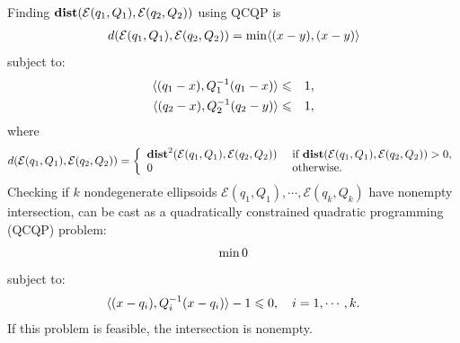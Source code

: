 \documentclass[letterpaper,10pt,english]{sphinxmanual}
\begin{document}
Finding \({\bf dist}({\mathcal E}(q_1,Q_1),{\mathcal E}(q_2,Q_2))\)
using QCQP is
\begin{gather}
\begin{split}d({\mathcal E}(q_1,Q_1),{\mathcal E}(q_2,Q_2)) = \min \langle (x-y), (x-y)\rangle\end{split}\notag
\end{gather}
subject to:
\begin{gather}
\begin{split}\begin{aligned}
\langle (q_1-x), Q_1^{-1}(q_1-x)\rangle & \leqslant& 1,\\
\langle (q_2-x), Q_2^{-1}(q_2-y)\rangle & \leqslant& 1,\end{aligned}\end{split}\notag
\end{gather}
where
\begin{gather}
\begin{split}d({\mathcal E}(q_1,Q_1),{\mathcal E}(q_2,Q_2))=\left\{\begin{array}{ll}
{\bf dist}^2({\mathcal E}(q_1,Q_1),{\mathcal E}(q_2,Q_2)) &
\mbox{ if } {\bf dist}({\mathcal E}(q_1,Q_1),{\mathcal E}(q_2,Q_2))>0, \\
0 & \mbox{ otherwise}. \end{array}\right.\end{split}\notag
\end{gather}
Checking if \(k\) nondegenerate ellipsoids
\({\mathcal E}(q_1,Q_1),\cdots,{\mathcal E}(q_k,Q_k)\) have nonempty
intersection, can be cast as a quadratically constrained quadratic
programming (QCQP) problem:
\begin{gather}
\begin{split}\min 0\end{split}\notag
\end{gather}
subject to:
\begin{gather}
\begin{split}\langle (x-q_i),Q_i^{-1}(x-q_i)\rangle - 1 \leqslant0, ~~~ i=1,\cdots,k.\end{split}\notag
\end{gather}
If this problem is feasible, the intersection is nonempty.
\end{document}
